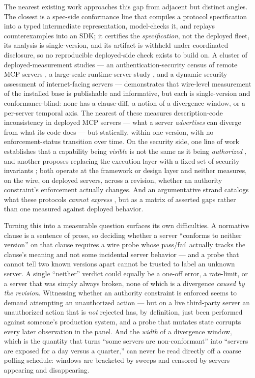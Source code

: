 \documentclass[11pt]{article}
\begin{document}
The nearest existing work approaches this gap from adjacent but distinct angles. The closest is a spec-side conformance line \citep{agentrfc} that compiles a protocol specification into a typed intermediate representation, model-checks it, and replays counterexamples into an SDK; it certifies the \emph{specification}, not the deployed fleet, its analysis is single-version, and its artifact is withheld under coordinated disclosure, so no reproducible deployed-side check exists to build on. A cluster of deployed-measurement studies --- an authentication-security census of remote MCP servers \citep{remotemcp}, a large-scale runtime-server study \citep{mcpzoo2026}, and a dynamic security assessment of internet-facing servers \citep{exposedbydesign2026} --- demonstrates that wire-level measurement of the installed base is publishable and informative, but each is single-version and conformance-blind: none has a clause-diff, a notion of a divergence window, or a per-server temporal axis. The nearest of these measures description-code inconsistency in deployed MCP servers \citep{dci2026} --- what a server \emph{advertises} can diverge from what its code does --- but statically, within one version, with no enforcement-status transition over time. On the security side, one line of work establishes that a capability being \emph{visible} is not the same as it being \emph{authorized} \citep{capgates}, and another proposes replacing the execution layer with a fixed set of security invariants \citep{hcp}; both operate at the framework or design layer and neither measures, on the wire, on deployed servers, across a revision, whether an authority constraint's enforcement actually changes. And an argumentative strand catalogs what these protocols \emph{cannot express} \citep{govgaps}, but as a matrix of asserted gaps rather than one measured against deployed behavior.

Turning this into a measurable question surfaces its own difficulties. A normative clause is a sentence of prose, so deciding whether a server ``conforms to neither version'' on that clause requires a wire probe whose pass/fail actually tracks the clause's meaning and not some incidental server behavior --- and a probe that cannot tell two known versions apart cannot be trusted to label an unknown server. A single ``neither'' verdict could equally be a one-off error, a rate-limit, or a server that was simply always broken, none of which is a divergence \emph{caused by the revision}. Witnessing whether an authority constraint is enforced seems to demand attempting an unauthorized action --- but on a live third-party server an unauthorized action that is \emph{not} rejected has, by definition, just been performed against someone's production system, and a probe that mutates state corrupts every later observation in the panel. And the \emph{width} of a divergence window, which is the quantity that turns ``some servers are non-conformant'' into ``servers are exposed for a day versus a quarter,'' can never be read directly off a coarse polling schedule: windows are bracketed by sweeps and censored by servers appearing and disappearing.
\end{document}
